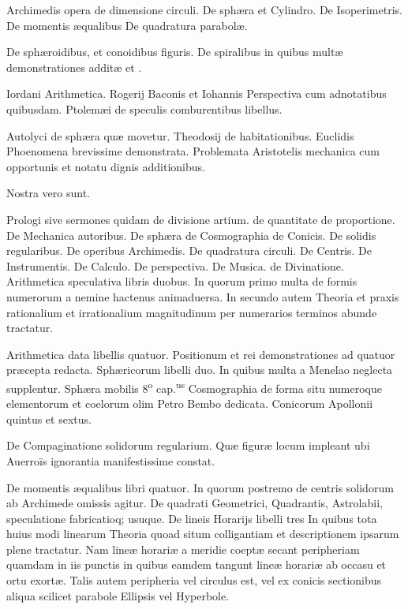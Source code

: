 \documentclass[11pt,a4paper]{article}
\begin{document}
Archimedis opera de dimensione circuli. De sphæra et Cylindro. De Isoperimetris. De momentis æqualibus De quadratura parabolæ.

De sphæroidibus, et conoidibus figuris. De spiralibus in quibus multæ demonstrationes additæ et .

Iordani Arithmetica. Rogerij Baconis et Iohannis Perspectiva cum adnotatibus quibusdam.
Ptolemæi de speculis comburentibus libellus.

Autolyci de sphæra quæ movetur. Theodosij de habitationibus. Euclidis Phoenomena brevissime demonstrata. Problemata Aristotelis mechanica cum opportunis et notatu dignis additionibus.

Nostra vero sunt.

Prologi sive sermones quidam de divisione artium. de quantitate de proportione. De Mechanica autoribus. De sphæra de Cosmographia de Conicis. De solidis regularibus. De operibus Archimedis. De quadratura circuli. De Centris. De Instrumentis. De Calculo. De perspectiva. De Musica. de Divinatione. Arithmetica speculativa libris duobus. In quorum primo multa de formis numerorum a nemine hactenus animaduersa. In secundo autem Theoria et praxis rationalium et irrationalium magnitudinum per numerarios terminos abunde tractatur.

Arithmetica data libellis quatuor. Positionum et rei demonstrationes ad quatuor præcepta redacta. Sphæricorum libelli duo. In quibus multa a Menelao neglecta supplentur. Sphæra mobilis 8\textsuperscript{o} cap.\textsuperscript{us} Cosmographia de forma situ numeroque elementorum et coelorum olim Petro Bembo dedicata. Conicorum Apollonii quintus et sextus.

De Compaginatione solidorum regularium. Quæ figuræ locum impleant ubi Auerroïs ignorantia manifestissime constat.

De momentis æqualibus libri quatuor. In quorum postremo de centris solidorum ab Archimede omissis agitur. De quadrati Geometrici, Quadrantis, Astrolabii, speculatione fabricatioq; usuque.
De lineis Horarijs libelli tres In quibus tota huius modi linearum Theoria quoad situm colligantiam et descriptionem ipsarum plene tractatur. Nam lineæ horariæ a meridie coeptæ secant peripheriam quamdam in iis punctis in quibus eamdem tangunt lineæ horariæ ab occasu et ortu exortæ. Talis autem peripheria vel circulus est, vel ex conicis sectionibus aliqua scilicet parabole Ellipsis vel Hyperbole.
\end{document}
